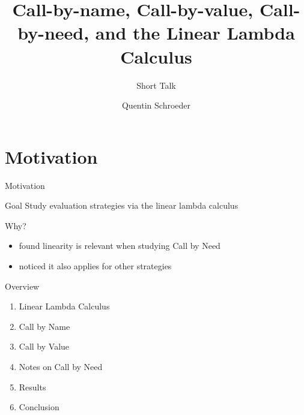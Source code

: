 \documentclass[10pt]{beamer}
\title{Call-by-name, Call-by-value, Call-by-need, and the Linear Lambda Calculus }
\subtitle{Short Talk}
\date{}
\author{Quentin Schroeder}
\institute{MPRI - Université Paris-Cité}
\begin{document}
\maketitle


\section[Idea]{Motivation}

\begin{frame}[fragile]{Motivation}
  \begin{alertblock}{Goal}
    Study evaluation strategies via the linear lambda calculus
  \end{alertblock}

  \begin{alertblock}{Why?}
    \begin{itemize}
      \item found linearity is relevant when studying Call by Need
      \item noticed it also applies for other strategies
    \end{itemize}
  \end{alertblock}
\end{frame}

\begin{frame}[fragile]{Overview}
  \begin{enumerate}
    \item Linear Lambda Calculus
    \item Call by Name
    \item Call by Value
    \item Notes on Call by Need
    \item Results
    \item Conclusion
  \end{enumerate}

\end{frame}



\end{document}

